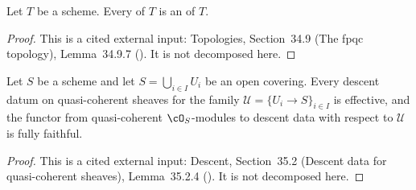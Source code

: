 \begin{lemma}
\label{lem:pc-fppf-covering-is-fpqc}
Let $T$ be a scheme.  Every  of $T$ is
an  of $T$.
\mathlibok\ 
\end{lemma}
\begin{proof}
This is a cited external input: Topologies, Section~34.9 (The fpqc topology),
Lemma~34.9.7 ().  It is not decomposed here.
\end{proof}

\begin{lemma}
\label{lem:pc-open-covering-descent}
Let $S$ be a scheme and let $S=\bigcup_{i\in I}U_i$ be an open covering.
Every descent datum on quasi-coherent sheaves for the family
$\mathcal U=\{U_i\to S\}_{i\in I}$ is effective, and the functor from
quasi-coherent $\cO_S$-modules to descent data with respect to
$\mathcal U$ is fully faithful.
\end{lemma}
\begin{proof}
This is a cited external input: Descent, Section~35.2 (Descent data for
quasi-coherent sheaves), Lemma~35.2.4 ().  It is not
decomposed here.
\end{proof}

